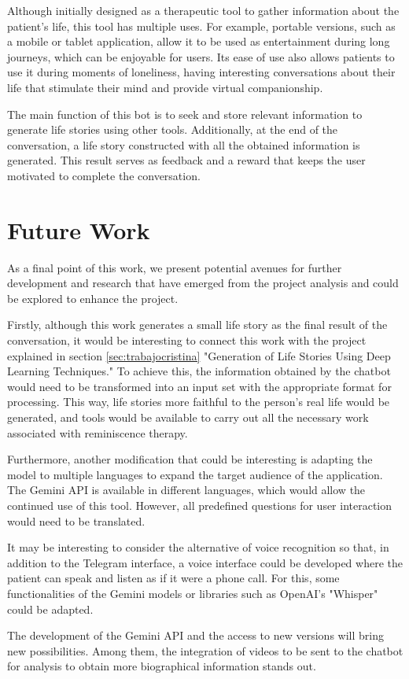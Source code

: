 Although initially designed as a therapeutic tool to gather information about the patient's life, this tool has multiple uses. For example, portable versions, such as a mobile or tablet application, allow it to be used as entertainment during long journeys, which can be enjoyable for users. Its ease of use also allows patients to use it during moments of loneliness, having interesting conversations about their life that stimulate their mind and provide virtual companionship.

The main function of this bot is to seek and store relevant information to generate life stories using other tools. Additionally, at the end of the conversation, a life story constructed with all the obtained information is generated. This result serves as feedback and a reward that keeps the user motivated to complete the conversation.

\section{Future Work}
As a final point of this work, we present potential avenues for further development and research that have emerged from the project analysis and could be explored to enhance the project.

Firstly, although this work generates a small life story as the final result of the conversation, it would be interesting to connect this work with the project explained in section \ref{sec:trabajocristina} "Generation of Life Stories Using Deep Learning Techniques." To achieve this, the information obtained by the chatbot would need to be transformed into an input set with the appropriate format for processing. This way, life stories more faithful to the person's real life would be generated, and tools would be available to carry out all the necessary work associated with reminiscence therapy.

Furthermore, another modification that could be interesting is adapting the model to multiple languages to expand the target audience of the application. The Gemini API is available in different languages, which would allow the continued use of this tool. However, all predefined questions for user interaction would need to be translated.

It may be interesting to consider the alternative of voice recognition so that, in addition to the Telegram interface, a voice interface could be developed where the patient can speak and listen as if it were a phone call. For this, some functionalities of the Gemini models or libraries such as OpenAI's "Whisper" could be adapted.

The development of the Gemini API and the access to new versions will bring new possibilities. Among them, the integration of videos to be sent to the chatbot for analysis to obtain more biographical information stands out.